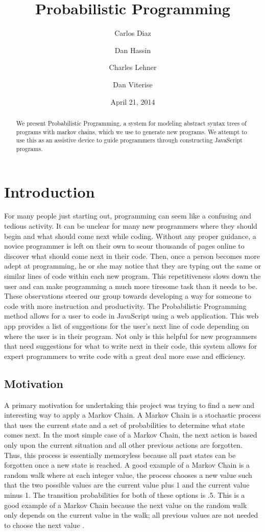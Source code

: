 \documentclass{article}
\title{
Probabilistic Programming
}
\author{
	Carlos Diaz
	\and
	Dan Hassin
	\and
	Charles Lehner
	\and
	Dan Viterise
}
\date{April 21, 2014}
\begin{document}
\maketitle

\begin{abstract}
	We present Probabilistic Programming, a system for modeling abstract syntax
	trees of programs with markov chains, which we use to generate new programs.
	We attempt to use this as an assistive device to guide programmers through
	constructing JavaScript programs.
\end{abstract}

\section{Introduction}
For many people just starting out, programming can seem like a confusing and
tedious activity. It can be unclear for many new programmers where they should
begin and what should come next while coding. Without any proper guidance, a
novice programmer is left on their own to scour thousands of pages online to
discover what should come next in their code. Then, once a person becomes more
adept at programming, he or she may notice that they are typing out the same or
similar lines of code within each new program. This repetitiveness slows down
the user and can make programming a much more tiresome task than it needs to be.
These observations steered our group towards developing a way for someone to
code with more instruction and productivity. The Probabilistic Programming
method allows for a user to code in JavaScript using a web application. This web
app provides a list of suggestions for the user's next line of code depending on
where the user is in their program. Not only is this helpful for new programmers
that need suggestions for what to write next in their code, this system allows
for expert programmers to write code with a great deal more ease and efficiency.

\subsection{Motivation}

A primary motivation for undertaking this project was trying to find a new and
interesting way to apply a Markov Chain.  A Markov Chain is a stochastic process
that uses the current state and a set of probabilities to determine what state
comes next. In the most simple case of a Markov Chain, the next action is based
only upon the current situation and all other previous actions are forgotten.
Thus, this process is essentially memoryless because all past states can be
forgotten once a new state is reached. A good example of a Markov Chain is a
random walk where at each integer value, the process chooses a new value such
that the two possible values are the current value plus 1 and the current value
minus 1. The transition probabilities for both of these options is .5. This is a
good example of a Markov Chain because the next value on the random walk only
depends on the current value in the walk; all previous values are not needed to
choose the next value \cite{markov}. 
\end{document}
